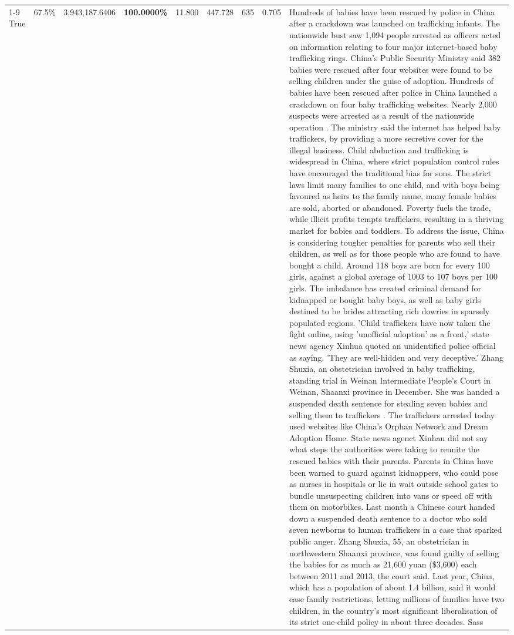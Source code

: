 \begin{table}[H]
\begin{tabular}{lllrlllll}
\cline{1-9}
True & 67.5\% & 3,943,187.6406 & \bfseries \color{red} 100.0000\% & 11.800 & 447.728 & 635 & 0.705 & Hundreds of babies have been rescued by police in China after a crackdown was launched on trafficking infants. The nationwide bust saw 1,094 people arrested as officers acted on information relating to four major internet-based baby trafficking rings. China's Public Security Ministry said 382 babies were rescued after four websites were found to be selling children under the guise of adoption. Hundreds of babies have been rescued after police in China launched a crackdown on four baby trafficking websites. Nearly 2,000 suspects were arrested as a result of the nationwide operation . The ministry said the internet has helped baby traffickers, by providing a more secretive cover for the illegal business. Child abduction and trafficking is widespread in China, where strict population control rules have encouraged the traditional bias for sons. The strict laws limit many families to one child, and with boys being favoured as heirs to the family name, many female babies are sold, aborted or abandoned. Poverty fuels the trade, while illicit profits tempts traffickers, resulting in a thriving market for babies and toddlers. To address the issue, China is considering tougher penalties for parents who sell their children, as well as for those people who are found to have bought a child. Around 118 boys are born for every 100 girls, against a global average of 1003 to 107 boys per 100 girls. The imbalance has created criminal demand for kidnapped or bought baby boys, as well as baby girls destined to be brides attracting rich dowries in sparsely populated regions. 'Child traffickers have now taken the fight online, using 'unofficial adoption' as a front,' state news agency Xinhua quoted an unidentified police official as saying. 'They are well-hidden and very deceptive.' Zhang Shuxia, an obstetrician involved in baby trafficking, standing trial in Weinan Intermediate People's Court in Weinan, Shaanxi province in December. She was handed a suspended death sentence for stealing seven babies and selling them to traffickers . The traffickers arrested today used websites like China's Orphan Network and Dream Adoption Home. State news agenct Xinhau did not say what steps the authorities were taking to reunite the rescued babies with their parents. Parents in China have been warned to guard against kidnappers, who could pose as nurses in hospitals or lie in wait outside school gates to bundle unsuspecting children into vans or speed off with them on motorbikes. Last month a Chinese court handed down a suspended death sentence to a doctor who sold seven newborns to human traffickers in a case that sparked public anger. Zhang Shuxia, 55, an obstetrician in northwestern Shaanxi province, was found guilty of selling the babies for as much as 21,600 yuan (\$3,600) each between 2011 and 2013, the court said. Last year, China, which has a population of about 1.4 billion, said it would ease family restrictions, letting millions of families have two children, in the country's most significant liberalisation of its strict one-child policy in about three decades. Sass \\

\end{tabular}
\end{table}
